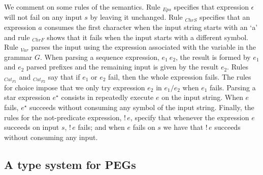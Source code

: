 \documentclass[preprint,12pt]{elsarticle}
\theoremstyle{definition}
\begin{document}
We comment on some rules of the semantics. Rule $_{Eps}$ specifies that
expression $\epsilon$ will not fail on any input $s$ by leaving it unchanged.
Rule $_{ChrS}$ specifies that an expression $a$ consumes the first character when
the input string starts with an `a' and rule $_{ChrF}$ shows that it fails when
the input starts with a different symbol. Rule $_{Var}$ parses the input using
the expression associated with the variable in the grammar $G$. When parsing a
sequence expression, $e_1\:e_2$, the result is formed by $e_1$ and $e_2$ parsed
prefixes and the remaining input is given by the result $e_2$. Rules $_{Cat_{F1}}$ and
$_{Cat_{F2}}$ say that if $e_1$ or $e_2$ fail, then the whole expression fails.
The rules for choice impose that we only try
expression $e_2$ in $e_1 / e_2$ when $e_1$ fails. Parsing a star
expression $e^\star$ consists in repeatedly execute $e$ on the input string.
When $e$ fails, $e^\star$ succeeds without consuming any symbol of the input
string. Finally, the rules for the not-predicate expression, $!\,e$, specify
that whenever the expression $e$ succeeds on input $s$, $!\,e$ fails; and when $e$
fails on $s$ we have that $!\,e$ succeeds without consuming any input.

\subsection{A type system for PEGs}
\end{document}
